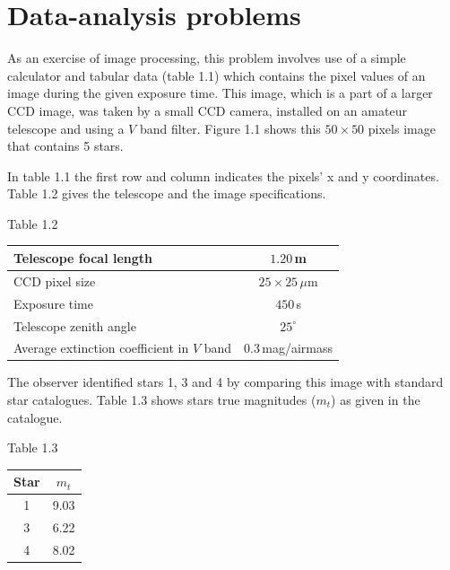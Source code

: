 \section*{Data-analysis problems}

As an exercise of image processing, this problem involves use of a simple
calculator and tabular data (table 1.1) which contains the pixel values of an
image during the given exposure time. This image, which is a part of a larger
CCD image, was taken by a small CCD camera, installed on an amateur telescope
and using a $V$ band filter. Figure 1.1 shows this $50 \times 50$ pixels
image that contains 5 stars.



In table 1.1 the first row and column indicates the pixels' x and y
coordinates. Table 1.2 gives the telescope and the image specifications.

\begin{center}
Table 1.2\\[2pt]
\begin{tabular}{|l|c|}
\hline
Telescope focal length & $1.20$\,m \\
\hline
CCD pixel size & $25 \times 25\,\mu$m \\
\hline
Exposure time & $450$\,s \\
\hline
Telescope zenith angle & $25^\circ$ \\
\hline
Average extinction coefficient in $V$ band & 0.3\,mag/airmass \\
\hline
\end{tabular}
\end{center}

The observer identified stars 1, 3 and 4 by comparing this image with
standard star catalogues. Table 1.3 shows stars true magnitudes ($m_t$) as
given in the catalogue.

\begin{center}
Table 1.3\\[2pt]
\begin{tabular}{|c|c|}
\hline
Star & $m_t$ \\
\hline
1 & 9.03 \\
\hline
3 & 6.22 \\
\hline
4 & 8.02 \\
\hline
\end{tabular}
\end{center}

